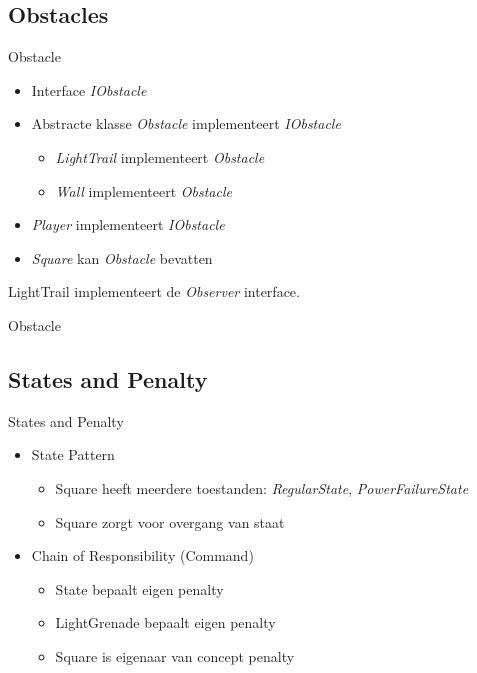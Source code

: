 \documentclass[t]{beamer}
\begin{document}
\subsection{Obstacles}
\begin{frame}{Obstacle}
\begin{center}
\begin{itemize}
	\item Interface \textit{IObstacle}
	\item  Abstracte klasse \textit{Obstacle} implementeert \textit{IObstacle}
	\begin{itemize}
		\item \textit{LightTrail} implementeert \textit{Obstacle}
		\item \textit{Wall} implementeert \textit{Obstacle}
	\end{itemize}
	\item \textit{Player} implementeert \textit{IObstacle}
	\item \textit{Square} kan \textit{Obstacle} bevatten
\end{itemize}
LightTrail implementeert de \textit{Observer} interface.
\end{center}
\end{frame}


\begin{frame}{Obstacle}
\begin{center}
\end{center}
\end{frame}

\subsection{States and Penalty}

\begin{frame}{States and Penalty}
\begin{itemize}
	\item State Pattern
	\begin{itemize}
		\item Square heeft meerdere toestanden: \textit{RegularState}, \textit{PowerFailureState}
		\item Square zorgt voor overgang van staat
	\end{itemize}
	\item Chain of Responsibility (Command)
	\begin{itemize}
		\item State bepaalt eigen penalty
		\item LightGrenade bepaalt eigen penalty
		\item Square is eigenaar van concept penalty
	\end{itemize}
\end{itemize}
\end{frame}
\end{document}
